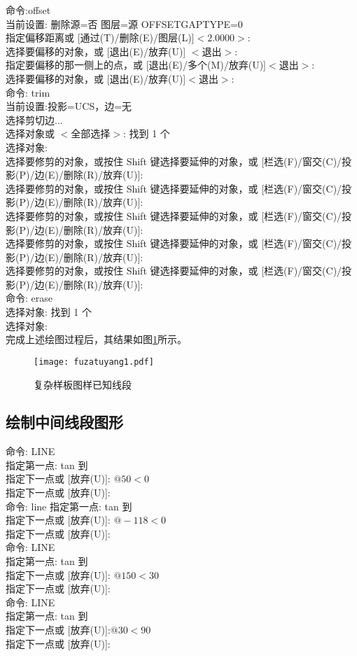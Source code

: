命令:offset\\
当前设置: 删除源=否  图层=源  OFFSETGAPTYPE=0\\
指定偏移距离或 [通过(T)/删除(E)/图层(L)]$ <2.0000>$: \\
选择要偏移的对象，或 [退出(E)/放弃(U)] $<$退出$>$:\\
指定要偏移的那一侧上的点，或 [退出(E)/多个(M)/放弃(U)]$ <$退出$>$:\\
选择要偏移的对象，或 [退出(E)/放弃(U)]$ <$退出$>$:\\
命令: trim\\
当前设置:投影=UCS，边=无\\
选择剪切边...\\
选择对象或 $<$全部选择$>$:  找到 1 个\\
选择对象:\\
选择要修剪的对象，或按住 Shift 键选择要延伸的对象，或
[栏选(F)/窗交(C)/投影(P)/边(E)/删除(R)/放弃(U)]:\\
选择要修剪的对象，或按住 Shift 键选择要延伸的对象，或
[栏选(F)/窗交(C)/投影(P)/边(E)/删除(R)/放弃(U)]:\\
选择要修剪的对象，或按住 Shift 键选择要延伸的对象，或
[栏选(F)/窗交(C)/投影(P)/边(E)/删除(R)/放弃(U)]:\\
选择要修剪的对象，或按住 Shift 键选择要延伸的对象，或
[栏选(F)/窗交(C)/投影(P)/边(E)/删除(R)/放弃(U)]:\\
选择要修剪的对象，或按住 Shift 键选择要延伸的对象，或
[栏选(F)/窗交(C)/投影(P)/边(E)/删除(R)/放弃(U)]:\\
命令: erase\\
选择对象: 找到 1 个\\
选择对象:\\

\indent
完成上述绘图过程后，其结果如图\ref{fig:fuzatuyang1}所示。
\begin{figure}[htbp]
\centering
\texttt{[image: fuzatuyang1.pdf]}
\caption{复杂样板图样已知线段}\label{fig:fuzatuyang1}
\end{figure}
\subsection{绘制中间线段图形}
\noindent
命令: LINE\\
指定第一点: tan 到\\
指定下一点或 [放弃(U)]: $@50<0$\\
指定下一点或 [放弃(U)]:\\
命令: line 指定第一点: tan 到\\
指定下一点或 [放弃(U)]: $@-118<0$\\
指定下一点或 [放弃(U)]:\\
命令: LINE \\
指定第一点: tan 到\\
指定下一点或 [放弃(U)]: $@150<30$\\
指定下一点或 [放弃(U)]:\\
命令: LINE \\
指定第一点: tan 到\\
指定下一点或 [放弃(U)]:$ @30<90$\\
指定下一点或 [放弃(U)]:\\

